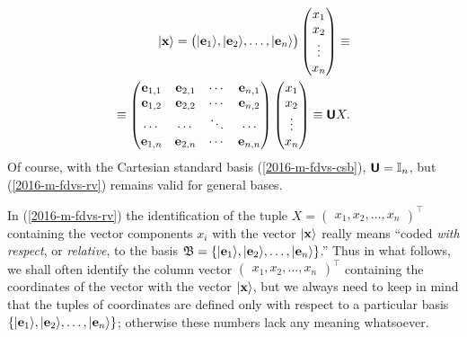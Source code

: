 \begin{equation}
\begin{split}
\vert {\bf x} \rangle =
\begin{pmatrix} \vert {\bf e}_1\rangle ,\vert {\bf e}_2 \rangle ,  \ldots , \vert {\bf e}_n\rangle \end{pmatrix}
\begin{pmatrix} x_1\\x_2\\ \vdots \\ x_n \end{pmatrix} \equiv
\\
\equiv
\begin{pmatrix}
{\bf e}_{1,1} &   {\bf e}_{2,1}  &  \cdots &  {\bf e}_{n,1}\\
{\bf e}_{1,2} &   {\bf e}_{2,2}  &  \cdots &  {\bf e}_{n,2}\\
\cdots  & \cdots  &  \ddots &  \cdots \\
{\bf e}_{1,n} &   {\bf e}_{2,n}  &  \cdots &  {\bf e}_{n,n}\\
\end{pmatrix}
\begin{pmatrix} x_1\\x_2\\ \vdots \\ x_n \end{pmatrix}
\equiv
\textsf{\textbf{U}} X
 .
\label{2016-m-fdvs-rv}
\end{split}
\end{equation}
Of course, with the Cartesian standard basis (\ref{2016-m-fdvs-csb}), $\textsf{\textbf{U}} = {\Bbb I}_n$, but
(\ref{2016-m-fdvs-rv}) remains valid for general bases.


In (\ref{2016-m-fdvs-rv}) the identification of the tuple
$ X = \begin{pmatrix}
x_1, x_2, \ldots , x_n
\end{pmatrix}^\intercal
$
containing the vector components $x_i$
with the vector $\vert {\bf x} \rangle $
really means
``coded {\em with respect}, or {\em relative},  to the basis ${\mathfrak B}=\{\vert {\bf e}_1 \rangle ,\vert {\bf e}_2 \rangle , \ldots , \vert {\bf e}_n \rangle \}$.''
Thus in what follows, we shall often identify the column vector
$
\begin{pmatrix}
x_1, x_2, \ldots , x_n
\end{pmatrix}^\intercal
$
containing the coordinates of the vector
with the vector $\vert {\bf x} \rangle$, but we always need to keep in mind that
the tuples of coordinates are defined only with respect to a particular basis
$\{\vert {\bf e}_1 \rangle ,\vert {\bf e}_2 \rangle , \ldots , \vert {\bf e}_n \rangle \}$;
otherwise these numbers lack any meaning whatsoever.



